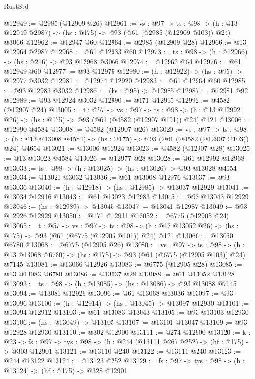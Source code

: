 \begin{lexlean}{RustStd}
\begin{coremodule}
@12949 := @2985 (@12909 @26)
@12961 := {vs : @97} ->
  {ts : @98} -> (h : @13 @12949 @2987) -> (hs : @175) -> @93 (@61 (@2985 (@12909 @103)) @24) @3066
@12962 := @12947 @60
@12964 := @2985 (@12909 @28)
@12966 := @13 @12964 @2987
@12968 := @61 @12933 @60
@12973 := {ts : @98} -> (h : @12966) -> (hs : @216) -> @93 @12968 @3066
@12974 := @12962 @64
@12976 := @61 @12949 @60
@12977 := @93 @12976
@12980 := (h : @12922) -> (hs : @95) -> @12977 @3032
@12981 := @12974 @12920
@12983 := @61 @12964 @60
@12985 := @93 @12983 @3032
@12986 := (hs : @95) -> @12985
@12987 := @12981 @92
@12989 := @93 @12924 @3032
@12990 := @171 @12915
@12992 := @4582 (@12907 @24)
@13005 := {t : @57} ->
  {vs : @97} ->
  {ts : @98} -> (h : @13 @12992 @26) -> (hs : @175) -> @93 (@61 (@4582 (@12907 @101)) @24) @121
@13006 := @12990 @4584
@13008 := @4582 (@12907 @26)
@13020 := {vs : @97} ->
  {ts : @98} -> (h : @13 @13008 @4584) -> (hs : @175) -> @93 (@61 (@4582 (@12907 @103)) @24) @4654
@13021 := @13006 @12924
@13023 := @4582 (@12907 @28)
@13025 := @13 @13023 @4584
@13026 := @12977 @28
@13028 := @61 @12992 @12968
@13033 := {ts : @98} -> (h : @13025) -> (hs : @13026) -> @93 @13028 @4654
@13034 := @13021 @3032
@13036 := @61 @13008 @12976
@13037 := @93 @13036
@13040 := (h : @12918) -> (hs : @12985) -> @13037 @12929
@13041 := @13034 @12916
@13043 := @61 @13023 @12983
@13045 := @93 @13043 @12929
@13046 := (hs : @12989) -> @13045
@13047 := @13041 @12987
@13049 := @93 @12926 @12929
@13050 := @171 @12911
@13052 := @6775 (@12905 @24)
@13065 := {t : @57} ->
  {vs : @97} ->
  {ts : @98} -> (h : @13 @13052 @26) -> (hs : @175) -> @93 (@61 (@6775 (@12905 @101)) @24) @121
@13066 := @13050 @6780
@13068 := @6775 (@12905 @26)
@13080 := {vs : @97} ->
  {ts : @98} -> (h : @13 @13068 @6780) -> (hs : @175) -> @93 (@61 (@6775 (@12905 @103)) @24) @7145
@13081 := @13066 @12926
@13083 := @6775 (@12905 @28)
@13085 := @13 @13083 @6780
@13086 := @13037 @28
@13088 := @61 @13052 @13028
@13093 := {ts : @98} -> (h : @13085) -> (hs : @13086) -> @93 @13088 @7145
@13094 := @13081 @12929
@13096 := @61 @13068 @13036
@13097 := @93 @13096
@13100 := (h : @12914) -> (hs : @13045) -> @13097 @12930
@13101 := @13094 @12912
@13103 := @61 @13083 @13043
@13105 := @93 @13103 @12930
@13106 := (hs : @13049) -> @13105
@13107 := @13101 @13047
@13109 := @93 @12928 @12930
@13110 := @302 @12900
@13111 := @274 @12900
@13120 := {k : @23} ->
  {fs : @97} -> {tys : @98} -> (h : @244 (@13111 @26) @252) -> (hf : @175) -> @303 @12901
@13121 := @13110 @240
@13122 := @13111 @240
@13123 := @244 @13122
@13124 := @13123 @252
@13129 := {fs : @97} -> {tys : @98} -> (h : @13124) -> (hf : @175) -> @328 @12901

\end{coremodule}
\end{lexlean}
